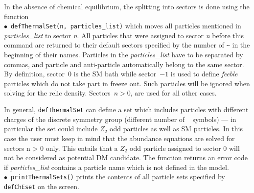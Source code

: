 \documentclass[12pt,a4paper]{article}
\begin{document}
In the absence of chemical equilibrium, the splitting into sectors is done using 
 the function
\\
$\bullet$~\verb|defThermalSet(n, particles_list)| 
 which moves all particles mentioned in {\it  particles\_list } to sector {\it n}. All
particles that were assigned to sector {\it n}  before this command are returned to their default sectors
specified by the number of  \verb|~| in the beginning of their names.
Particles in the {\it particles\_list} have to be separated by commas, and particle and anti-particle
automatically belong to the same sector.  By definition, sector~$0$ is the SM bath while 
sector~$-1$ is used to define {\it feeble} particles which do not take part in freeze out. Such particles will be ignored when solving for the relic density. 
Sectors~$n>0$, are used for all other cases. 


In general, \verb|defThermalSet| can define a set which includes particles with different
charges of the discrete symmetry group (different number of ~ symbols) — in particular
the set could include $Z_2$ odd particles as well as SM particles. In this case the user
must keep in mind that the abundance equations are solved for sectors n > 0 only. This
entails that a $Z_2$ odd particle assigned to sector 0 will not be considered as potential DM
candidate. The function returns an error code if {\it particles\_list} contains a particle name
which is not defined in the model.
\\
$\bullet$~\verb|printThermalSets()| prints the contents of all particle sets specified by \verb|defChEset| on the screen. 
\end{document}
